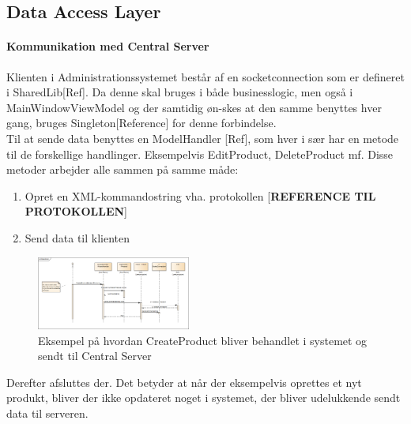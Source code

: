 \subsection{Data Access Layer}
\paragraph*{Kommunikation med Central Server}
Klienten i Administrationssystemet består af en socketconnection som er defineret i SharedLib[Ref]. Da denne skal bruges i både businesslogic, men også i MainWindowViewModel og der samtidig øn-skes at den samme benyttes hver gang, bruges Singleton[Reference] for denne forbindelse. \\
Til at sende data benyttes en ModelHandler [Ref], som hver i sær har en metode til de forskellige handlinger. Eksempelvis EditProduct, DeleteProduct mf. Disse metoder arbejder alle sammen på samme måde:
\begin{enumerate}
\item Opret en XML-kommandostring vha. protokollen [\textbf{REFERENCE TIL PROTOKOLLEN}]
\item Send data til klienten
\end{enumerate}


\begin{figure}[!h]
    \centering
    \includegraphics[width=0.45\textwidth]{Systemdesign/backend/Images/DataSend.png}
    \caption{Eksempel på hvordan CreateProduct bliver behandlet i systemet og sendt til Central Server}
    \label{fig:CreateSend}
\end{figure}

Derefter afsluttes der. Det betyder at når der eksempelvis oprettes et nyt produkt, bliver der ikke opdateret noget i systemet, der bliver udelukkende sendt data til serveren.\\


